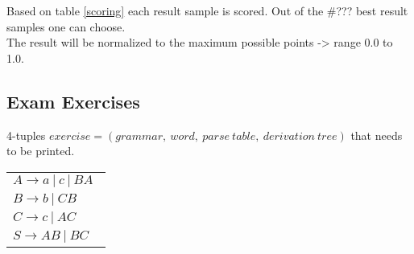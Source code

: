 \noindent Based on table \ref{scoring} each result sample is scored. Out of the \#??? best result samples one can choose.\\
The result will be normalized to the maximum possible points -> range 0.0 to 1.0. 

\subsection{Exam Exercises}
4-tuples $exercise = (grammar,\ word,\ parse\ table,\ derivation\ tree)$ that needs to be printed.

\begin{center} 
	\begin{tabular}{l}$A\rightarrow a~|~c~|~BA~~$\\ 
		$B\rightarrow b~|~CB~~$\\ 
		$C\rightarrow c~|~AC~~$\\ 
		$S\rightarrow AB~|~BC~~$\\ 
	\end{tabular} 
\end{center}

